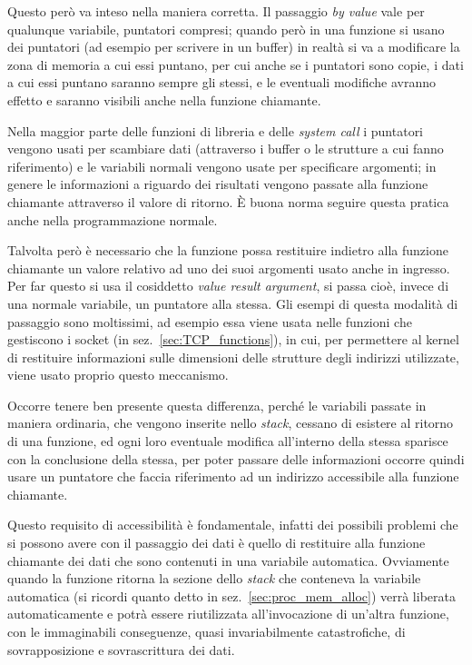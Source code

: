 Questo però va inteso nella maniera corretta. Il passaggio \textit{by value}
vale per qualunque variabile, puntatori compresi; quando però in una funzione
si usano dei puntatori (ad esempio per scrivere in un buffer) in realtà si va
a modificare la zona di memoria a cui essi puntano, per cui anche se i
puntatori sono copie, i dati a cui essi puntano saranno sempre gli stessi, e
le eventuali modifiche avranno effetto e saranno visibili anche nella funzione
chiamante.

Nella maggior parte delle funzioni di libreria e delle \textit{system call} i
puntatori vengono usati per scambiare dati (attraverso i buffer o le strutture
a cui fanno riferimento) e le variabili normali vengono usate per specificare
argomenti; in genere le informazioni a riguardo dei risultati vengono passate
alla funzione chiamante attraverso il valore di ritorno.  È buona norma
seguire questa pratica anche nella programmazione normale.


Talvolta però è necessario che la funzione possa restituire indietro alla
funzione chiamante un valore relativo ad uno dei suoi argomenti usato anche in
ingresso.  Per far questo si usa il cosiddetto \textit{value result argument},
si passa cioè, invece di una normale variabile, un puntatore alla stessa. Gli
esempi di questa modalità di passaggio sono moltissimi, ad esempio essa viene
usata nelle funzioni che gestiscono i socket (in
sez.~\ref{sec:TCP_functions}), in cui, per permettere al kernel di restituire
informazioni sulle dimensioni delle strutture degli indirizzi utilizzate,
viene usato proprio questo meccanismo.

Occorre tenere ben presente questa differenza, perché le variabili passate in
maniera ordinaria, che vengono inserite nello \textit{stack}, cessano di
esistere al ritorno di una funzione, ed ogni loro eventuale modifica
all'interno della stessa sparisce con la conclusione della stessa, per poter
passare delle informazioni occorre quindi usare un puntatore che faccia
riferimento ad un indirizzo accessibile alla funzione chiamante.


Questo requisito di accessibilità è fondamentale, infatti dei possibili
problemi che si possono avere con il passaggio dei dati è quello di restituire
alla funzione chiamante dei dati che sono contenuti in una variabile
automatica.  Ovviamente quando la funzione ritorna la sezione dello
\textit{stack} che conteneva la variabile automatica (si ricordi quanto detto
in sez.~\ref{sec:proc_mem_alloc}) verrà liberata automaticamente e potrà
essere riutilizzata all'invocazione di un'altra funzione, con le immaginabili
conseguenze, quasi invariabilmente catastrofiche, di sovrapposizione e
sovrascrittura dei dati.

